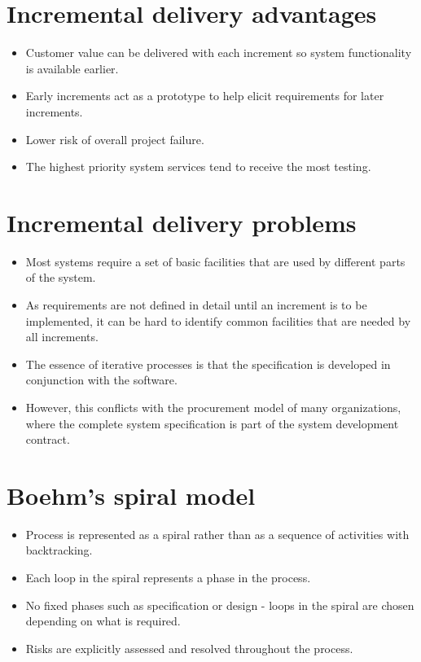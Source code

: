 \section{Incremental delivery advantages}
\begin{itemize}
\item Customer value can be delivered with each increment so system functionality is available earlier.

\item Early increments act as a prototype to help elicit requirements for later increments.

\item Lower risk of overall project failure.

\item The highest priority system services tend to receive the most testing.
\end{itemize}

\section{Incremental delivery problems}
\begin{itemize}

\item Most systems require a set of basic facilities that are used by different parts of the system.
\item As requirements are not defined in detail until an increment is to be implemented, it can be hard to identify common facilities that are needed by all increments.
\item The essence of iterative processes is that the specification is developed in conjunction with the software.
\item However, this conflicts with the procurement model of many organizations, where the complete system specification is part of the system development contract.
\end{itemize}

\section{Boehm’s spiral model}

\begin{itemize}
\item Process is represented as a spiral rather than as a sequence of activities with backtracking.
\item Each loop in the spiral represents a phase in the process.
\item No fixed phases such as specification or design - loops in the spiral are chosen depending on what is required.
\item Risks are explicitly assessed and resolved throughout the process.
\end{itemize}

